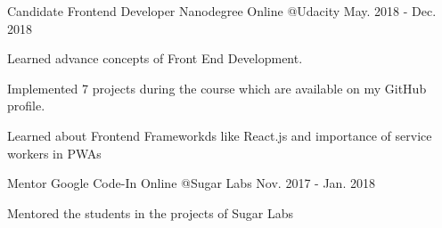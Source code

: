 \begin{cventries}
\cventry
    {Candidate}
    {Frontend Developer Nanodegree}
    {Online @Udacity}
    {May. 2018 - Dec. 2018}
    {
      \begin{cvitems}
        \item {Learned advance concepts of Front End Development.}
        \item {Implemented 7 projects during the course which are available on my GitHub profile.}
        \item {Learned about Frontend Frameworkds like React.js and importance of service workers in PWAs}
      \end{cvitems}
    }
  \cventry
    {Mentor}
    {Google Code-In}
    {Online @Sugar Labs}
    {Nov. 2017 - Jan. 2018}
    {
      \begin{cvitems}
        \item {Mentored the students in the projects of Sugar Labs}
      \end{cvitems}
    }
\end{cventries}